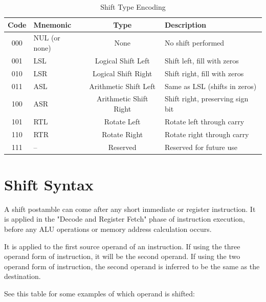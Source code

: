 \begin{table}[H]
	\centering
	\begin{tabular}{clcp{7cm}}
		\toprule
		\textbf{Code} & \textbf{Mnemonic} & \textbf{Type}          & \textbf{Description}             \\
		\midrule
		000           & NUL (or none)     & None                   & No shift performed               \\
		001           & LSL               & Logical Shift Left     & Shift left, fill with zeros      \\
		010           & LSR               & Logical Shift Right    & Shift right, fill with zeros     \\
		011           & ASL               & Arithmetic Shift Left  & Same as LSL (shifts in zeros)    \\
		100           & ASR               & Arithmetic Shift Right & Shift right, preserving sign bit \\
		101           & RTL               & Rotate Left            & Rotate left through carry        \\
		110           & RTR               & Rotate Right           & Rotate right through carry       \\
		111           & --                & Reserved               & Reserved for future use          \\
		\bottomrule
	\end{tabular}
	\caption{Shift Type Encoding}
	\label{tab:shift-encoding}
\end{table}

\section{Shift Syntax}

A shift postamble can come after any short immediate or register instruction. It is applied in the "Decode and Register
Fetch" phase of instruction execution, before any ALU operations or memory address calculation occurs.

It is applied to the first source operand of an instruction. If using the three operand form of instruction, it will be
the second operand. If using the two operand form of instruction, the second operand is inferred to be the same as the
destination.

See this table for some examples of which operand is shifted:

